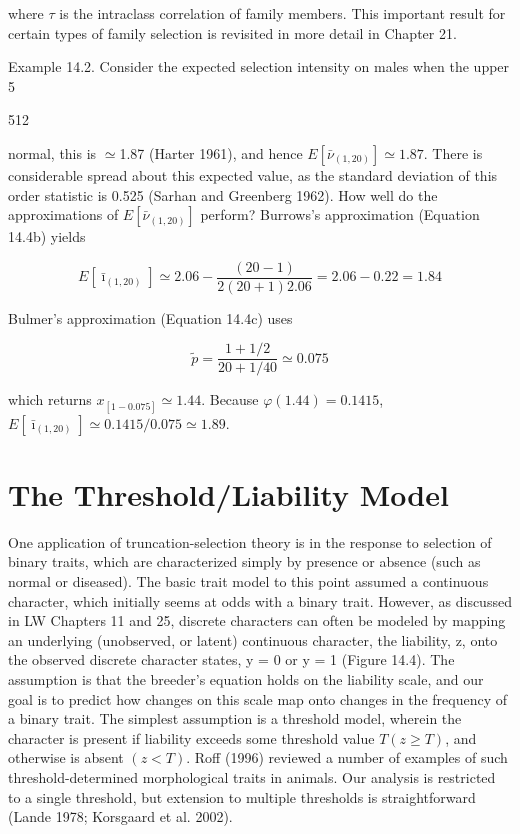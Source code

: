 \documentclass{article}
\begin{document}
where  $ \tau $ is the intraclass correlation of family members. This important result for certain types of family selection is revisited in more detail in Chapter 21.

Example 14.2. Consider the expected selection intensity on males when the upper 5%

512

normal, this is  $ \simeq $1.87 (Harter 1961), and hence  $ E[\bar{\nu}_{(1,20)}] \simeq 1.87 $. There is considerable spread about this expected value, as the standard deviation of this order statistic is 0.525 (Sarhan and Greenberg 1962). How well do the approximations of  $ E[\bar{\nu}_{(1,20)}] $ perform? Burrows's approximation (Equation 14.4b) yields

\begin{equation}
E\left[\bar{\imath}_{(1,20)}\right]\simeq2.06-\frac{(20-1)}{2\left(20+1\right)2.06}=2.06-0.22=1.84
\end{equation}

Bulmer's approximation (Equation 14.4c) uses

\begin{equation}
\widetilde{p}=\frac{1+1/2}{20+1/40}\simeq0.075
\end{equation}

which returns  $ x_{[1-0.075]} \simeq 1.44 $. Because  $ \varphi(1.44) = 0.1415 $,  $ E[\bar{\imath}_{(1,20)}] \simeq 0.1415/0.075 \simeq 1.89 $.

\section{The Threshold/Liability Model}
One application of truncation-selection theory is in the response to selection of binary traits, which are characterized simply by presence or absence (such as normal or diseased). The basic trait model to this point assumed a continuous character, which initially seems at odds with a binary trait. However, as discussed in LW Chapters 11 and 25, discrete characters can often be modeled by mapping an underlying (unobserved, or latent) continuous character, the liability, z, onto the observed discrete character states, y = 0 or y = 1 (Figure 14.4). The assumption is that the breeder's equation holds on the liability scale, and our goal is to predict how changes on this scale map onto changes in the frequency of a binary trait. The simplest assumption is a threshold model, wherein the character is present if liability exceeds some threshold value  $ T \left( z \geq T \right) $, and otherwise is absent  $ (z < T) $. Roff (1996) reviewed a number of examples of such threshold-determined morphological traits in animals. Our analysis is restricted to a single threshold, but extension to multiple thresholds is straightforward (Lande 1978; Korsgaard et al. 2002).
\end{document}
